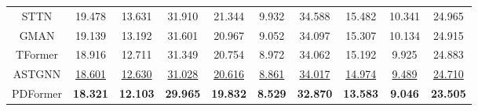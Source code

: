 \documentclass[letterpaper]{article} \usepackage{aaai23}  \usepackage{times}  \usepackage{helvet}  \usepackage{courier}  \usepackage[hyphens]{url}  \usepackage{graphicx} \urlstyle{rm} \def\UrlFont{\rm}  \usepackage{natbib}  \usepackage{caption} \frenchspacing  \setlength{\pdfpagewidth}{8.5in} \setlength{\pdfpageheight}{11in} \usepackage{algorithm}
\newcommand{\name}{PDFormer\xspace}
\begin{document}
\begin{table}[t]
{\begin{tabular}{c|ccc|ccc|ccc}
    \hline
    STTN  & 19.478  & 13.631  & 31.910  & 21.344  & 9.932  & 34.588  & 15.482  & 10.341  & 24.965  \\
    GMAN  & 19.139  & 13.192  & 31.601  & 20.967  & 9.052  & 34.097  & 15.307  & 10.134  & 24.915  \\
    TFormer & 18.916  & 12.711  & 31.349  & 20.754  & 8.972  & 34.062  & 15.192  & 9.925  & 24.883  \\
    ASTGNN & \underline{18.601}  & \underline{12.630}  & \underline{31.028}  & \underline{20.616}  & \underline{8.861}  & \underline{34.017}  & \underline{14.974}  & \underline{9.489}  & \underline{24.710}  \\
    \hline
    \name & \textbf{18.321 } & \textbf{12.103 } & \textbf{29.965 } & \textbf{19.832 } & \textbf{8.529 } & \textbf{32.870 } & \textbf{13.583 } & \textbf{9.046 } & \textbf{23.505 } \\
    \bottomrule
    \end{tabular}}
  \label{tab:res_graph}\end{table}
\end{document}
